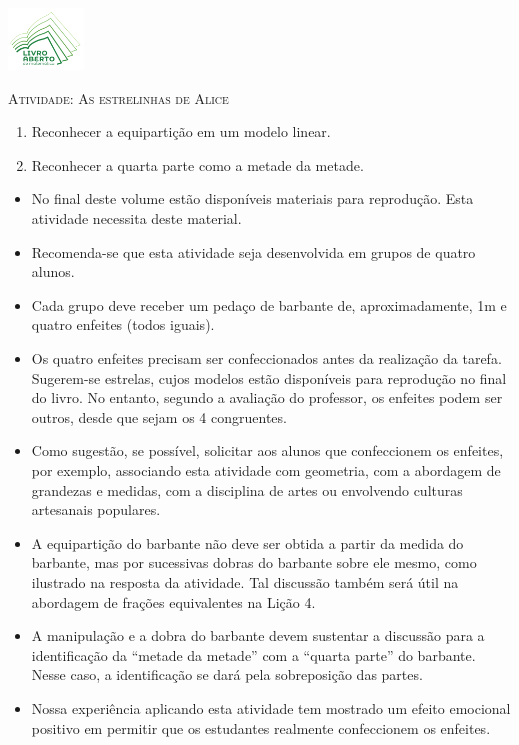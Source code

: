 \documentclass[10 pt,usenames,dvipsnames, oneside]{article}
\begin{document}
\begin{center}
  \begin{minipage}[l]{3cm}
\includegraphics[width=2cm]{../../../Figuras/logo}       
\end{minipage}\hfill
\begin{minipage}[r]{.8\textwidth}
 {\Large \scshape Atividade: As estrelinhas de Alice}  
\end{minipage}
\end{center}
\vspace{.2cm}

\ifdefined\prof
\begin{goals}
\begin{enumerate}
    \item       Reconhecer a equipartição em um modelo linear.
    \item       Reconhecer a quarta parte como a metade da metade.
\end{enumerate}
\tcblower
\begin{itemize} %
   \item No final deste volume estão disponíveis materiais para reprodução. Esta atividade necessita deste material.
   \item Recomenda-se que esta atividade seja desenvolvida em grupos de quatro alunos.
   \item       Cada grupo deve receber um pedaço de barbante de, aproximadamente, 1m e quatro enfeites (todos iguais).
    \item       Os quatro enfeites precisam ser confeccionados antes da realização da tarefa. Sugerem-se estrelas, cujos modelos estão disponíveis para reprodução no final do livro. No entanto, segundo a avaliação do professor, os enfeites podem ser outros, desde que sejam os 4 congruentes.
    \item       Como sugestão, se possível, solicitar aos alunos que confeccionem os enfeites, por exemplo, associando esta atividade com geometria, com a abordagem de grandezas e medidas, com a disciplina de artes ou envolvendo culturas artesanais populares.
    \item       A equipartição do barbante não deve ser obtida a partir da medida do barbante, mas por sucessivas dobras do barbante sobre ele mesmo, como ilustrado na resposta da atividade. Tal discussão também  será útil na abordagem de frações equivalentes na Lição 4.
    \item       A manipulação e a dobra do barbante devem sustentar a discussão para a identificação da       ``metade da metade'' com a       ``quarta parte'' do barbante. Nesse caso, a identificação se dará pela sobreposição das partes.
      \item Nossa experiência aplicando esta atividade tem mostrado um efeito emocional positivo em permitir que os estudantes realmente confeccionem os enfeites.
\end{itemize} %

\end{goals}
\end{document}
